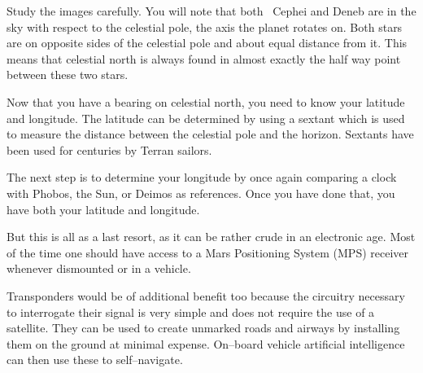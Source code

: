     {}
    {}
    {}
    \stopcombination

Study the images carefully. You will note that both \alpha\ Cephei and Deneb are  in the sky with respect to the celestial pole, the axis the planet rotates on. Both stars are on opposite sides of the celestial pole and about equal distance from it. This means that celestial north is always found in almost exactly the half way point between these two stars.

Now that you have a bearing on celestial north, you need to know your latitude and longitude. The latitude can be determined by using a sextant which is used to measure the distance between the celestial pole and the horizon. Sextants have been used for centuries by Terran sailors. 

The next step is to determine your longitude by once again comparing a clock with Phobos, the Sun, or Deimos as references. Once you have done that, you have both your latitude and longitude.

But this is all as a last resort, as it can be rather crude in an electronic age. Most of the time one should have access to a Mars Positioning System (MPS) receiver whenever dismounted or in a vehicle. 

Transponders would be of additional benefit too because the circuitry necessary to interrogate their signal is very simple and does not require the use of a satellite. They can be used to create unmarked roads and airways by installing them on the ground at minimal expense. On--board vehicle artificial intelligence can then use these to self--navigate.


